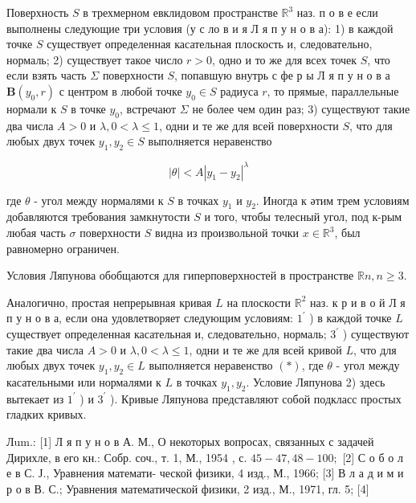 \documentclass[10pt]{article}
\begin{document}
Поверхность $S$ в трехмерном евклидовом пространстве $\mathbb{R}^{3}$ наз. п о в е если выполнены следующие три условия (у с ло в и я Л я п у н о в а): 1) в каждой точке $S$ существует определенная касательная плоскость и, следовательно, нормаль; 2) существует такое число $r>0$, одно и то же для всех точек $S$, что если взять часть $\Sigma$ поверхности $S$, попавшую внутрь с фе р ы Л я п у н о в а $\boldsymbol{B}\left(y_{0}, r\right)$ с центром в любой точке $y_{0} \in S$ радиуса $r$, то прямые, параллельные нормали к $S$ в точке $y_{0}$, встречают $\Sigma$ не более чем один раз; 3) существуют такие два числа $A>0$ и $\lambda, 0<\lambda \leqslant 1$, одни и те же для всей поверхности $S$, что для любых двух точек $y_{1}, y_{2} \in S$ выполняется неравенство



\[

|\theta|<A\left|y_{1}-y_{2}\right|^{\lambda}

\]



где $\theta$ - угол между нормалями к $S$ в точках $y_{1}$ и $y_{2}$. Иногда к әтим трем условиям добавляются требования замкнутости $S$ и того, чтобы телесный угол, под к-рым любая часть $\sigma$ поверхности $S$ видна из произвольной точки $x \in \mathbb{R}^{3}$, был равномерно ограничен.



Условия Ляпунова обобщаются для гиперповерхностей в пространстве $\mathbb{R} n, n \geqslant 3$.



Аналогично, простая непрерывная кривая $L$ на плоскости $\mathbb{R}^{2}$ наз. к р и в о й Л я п у н о в а, если она удовлетворяет следующим условиям: $1^{\prime}$ ) в каждой точке $L$ существует определенная касательная и, следовательно, нормаль; $3^{\prime}$ ) существуют такие два числа $A>0$ и $\lambda, 0<\lambda \leqslant 1$, одни и те же для всей кривой $L$, что для любых двух точек $y_{1}, y_{2} \in L$ выполняется неравенство $(*)$, где $\theta$ - угол между касательными или нормалями к $L$ в точках $y_{1}, y_{2}$. Условие Ляпунова 2) здесь вытекает из $1^{\prime}$ ) и $3^{\prime}$ ). Кривые Ляпунова представляют собой подкласс простых гладких кривых.



Лum.: [1] Л я п у н о в А. М., О некоторых вопросах, связанных с задачей Дирихле, в его кн.: Собр. соч., т. 1, М., 1954 , с. $45-47,48-100 ;$ [2] С о б о л е в С. Ј., Уравнения математи- ческой физики, 4 изд., М., 1966; [3] В л а д и м и р о в В. С.; Уравнения математической физики, 2 изд., М., 1971, гл. 5; [4]
\end{document}
